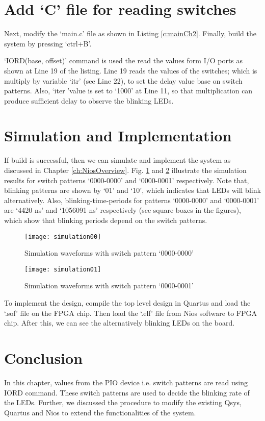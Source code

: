\section{Add `C' file for reading switches}
Next, modify the `main.c' file as shown in Listing \ref{c:mainCh2}. Finally, build the system by pressing `ctrl+B'. 

\begin{explanation}
	`IORD(base, offset)' command is used the read the values form I/O ports as shown at Line 19 of the listing. Line 19 reads the values of the switches; which is multiply by variable `itr' (see Line 22), to set the delay value base on switch patterns. Also, `iter 'value is set to `1000' at Line 11, so that multiplication can produce sufficient delay to observe the blinking LEDs.
\end{explanation}



\section{Simulation and Implementation}
If build is successful, then we can simulate and implement the system as discussed in Chapter \ref{ch:NiosOverview}. Fig. \ref{fig:simulation00} and \ref{fig:simulation01} illustrate the simulation results for switch patterns `0000-0000' and `0000-0001' respectively. Note that, blinking patterns are shown by `01' and `10', which indicates that LEDs will blink alternatively. Also, blinking-time-periods for patterns `0000-0000' and `0000-0001' are `4420 ns' and `1056091 ns' respectively (see square boxes in the figures), which show that blinking periods depend on the switch patterns. 

\begin{figure}[!h]
	\centering
	\texttt{[image: simulation00]}
	\caption{Simulation waveforms with switch pattern `0000-0000'}
	\label{fig:simulation00}
\end{figure}
\begin{figure}[!h]
	\centering
	\texttt{[image: simulation01]}
	\caption{Simulation waveforms with switch pattern `0000-0001'}
	\label{fig:simulation01}
\end{figure}	

To implement the design, compile the top level design in Quartus and load the `.sof' file on the FPGA chip. Then load the `.elf' file from Nios software to FPGA chip. After this, we can see the alternatively blinking LEDs on the board. 

\section{Conclusion}
In this chapter, values from the PIO device i.e. switch patterns are read using IORD command. These switch patterns are used to decide the blinking rate of the LEDs. Further, we discussed the procedure to modify the existing Qsys, Quartus and Nios to extend the functionalities of the system. 



